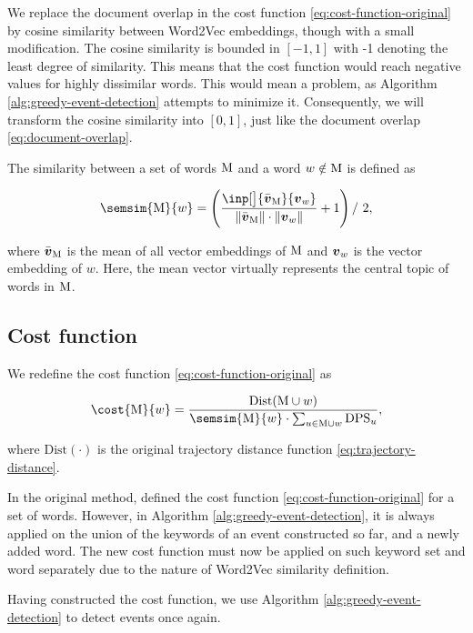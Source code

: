 We replace the document overlap in the cost function \eqref{eq:cost-function-original} by cosine similarity between Word2Vec embeddings, though with a small modification. The cosine similarity is bounded in $[-1, 1]$ with -1 denoting the least degree of similarity. This means that the cost function would reach negative values for highly dissimilar words. This would mean a problem, as Algorithm \ref{alg:greedy-event-detection} attempts to minimize it. Consequently, we will transform the cosine similarity into $[0, 1]$, just like the document overlap \eqref{eq:document-overlap}.

The similarity between a set of words $\text{M}$ and a word $w \notin \text{M}$ is defined as

\begin{equation}
	\semsim{\featset}{w} = \left( \frac{\inp[\big]{\bar{\embed}_{\featset}}{\embed_{w}}}{\| \bar{\embed}_{\featset} \| \cdot \| \embed_{w} \|} + 1 \right) /\ 2,
\end{equation}

where $\bar{\embed}_{\featset}$ is the mean of all vector embeddings of $\text{M}$ and $\embed_{w}$ is the vector embedding of $w$. Here, the mean vector virtually represents the central topic of words in $\text{M}$.


\subsection{Cost function}
We redefine the cost function \eqref{eq:cost-function-original} as

\begin{equation} \label{eq:cost-function}
	\cost{\featset}{w} = \frac{\text{Dist}( \featset \cup w )}{\semsim{\featset}{w} \cdot \sum_{u \in \featset \cup w}{\text{DPS}_{u}}},
\end{equation}

where $\text{Dist}(\cdot)$ is the original trajectory distance function \eqref{eq:trajectory-distance}.

In the original method, \cite{event-detection} defined the cost function \eqref{eq:cost-function-original} for a set of words. However, in Algorithm \ref{alg:greedy-event-detection}, it is always applied on the union of the keywords of an event constructed so far, and a newly added word. The new cost function must now be applied on such keyword set and word separately due to the nature of Word2Vec similarity definition.

Having constructed the cost function, we use Algorithm \ref{alg:greedy-event-detection} to detect events once again.

